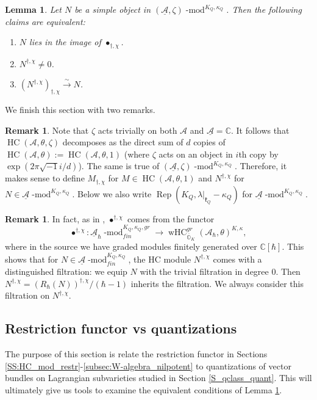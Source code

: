 \documentclass[12pt]{amsart}
\newcommand{\C}{\mathbb{C}}
\newcommand{\A}{\mathcal{A}}
\newcommand{\Orb}{\mathbb{O}}
\newcommand{\kf}{\mathfrak{k}}
\newcommand{\HC}{\operatorname{HC}}
\newcommand{\wHC}{\operatorname{wHC}}
\newtheorem{Lem}[Thm]{Lemma}
\theoremstyle{definition}
\newtheorem{Rem}[Thm]{Remark}
\numberwithin{equation}{section}
\begin{document}
\begin{Lem}\label{Lem:image_description}
Let $N$ be a simple object in $(\underline{\A},\zeta)\operatorname{-mod}^{K_Q,\kappa_Q}$. Then the following claims
are equivalent:
\begin{enumerate}
\item $N$ lies in the image of $\bullet_{\dagger,\chi}$.
\item $N^{\dagger,\chi}\neq 0$.
\item $(N^{\dagger,\chi})_{\dagger,\chi}\xrightarrow{\sim} N$.
\end{enumerate}
\end{Lem}

We finish this section with two remarks.

\begin{Rem}\label{Rem:removing_zeta}
Note that $\zeta$ acts trivially on both $\A$ and $\underline{\A}=\C$. It follows that $\HC(\A,\theta,\zeta)$
decomposes as the direct sum of $d$ copies of $\HC(\A,\theta):=\HC(\A,\theta,1)$ (where $\zeta$
acts on an object in $i$th copy by $\exp(2\pi\sqrt{-1}i/d)$). The same is true of $(\underline{\A},\zeta)\operatorname{-mod}^{K_Q,\kappa_Q}$.
Therefore, it makes sense to define $M_{\dagger,\chi}$ for $M\in \HC(\A,\theta,1)$
and $N^{\dagger,\chi}$ for $N\in \underline{\A}\operatorname{-mod}^{K_Q,\kappa_Q}$.
Below we also write $\operatorname{Rep}(K_Q,\lambda|_{\kf_Q}-\kappa_Q)$ for $\underline{\A}\operatorname{-mod}^{K_Q,\kappa_Q}$.
\end{Rem}

\begin{Rem}\label{Rem:distinguished_filtration}
In fact, as in \cite[Section 3.4]{HC}, $\bullet^{\dagger,\chi}$ comes from
the functor $$\bullet^{\dagger,\chi}:
\underline{\A}_\hbar\operatorname{-mod}^{K_Q,\kappa_Q,gr}_{fin}
\rightarrow \wHC_{\overline{\Orb}_K}^{gr}(\A_\hbar,\theta)^{K,\kappa},$$
where in the source we have graded modules finitely generated over $\C[\hbar]$.
This shows that for $N\in \underline{\A}\operatorname{-mod}^{K_Q,\kappa_Q}_{fin}$,
the HC module $N^{\dagger,\chi}$ comes with a distinguished filtration: we equip
$N$ with the trivial filtration in degree $0$. Then $N^{\dagger,\chi}=(R_\hbar(N))^{\dagger,\chi}/(\hbar-1)$ inherits the filtration.
We always consider this filtration on $N^{\dagger,\chi}$.
\end{Rem}

\subsection{Restriction functor vs quantizations}
The purpose of this section is relate the restriction functor in Sections \ref{SS:HC_mod_restr}-\ref{subsec:W-algebra_nilpotent} to
quantizations of vector bundles on Lagrangian subvarieties studied in Section
\ref{S_qclass_quant}. This will ultimately give us tools to examine the
equivalent conditions of Lemma \ref{Lem:image_description}.
\end{document}
